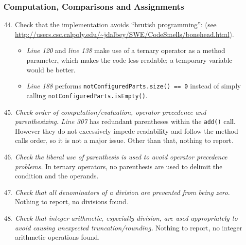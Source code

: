 	\subsubsection{Computation, Comparisons and Assignments}
		\begin{enumerate}
			\setcounter{enumi}{43}
			\item \begin{itshape}
				Check that the implementation avoids “brutish programming”: (see \url{http://users.csc.calpoly.edu/~jdalbey/SWE/CodeSmells/bonehead.html}).
				\end{itshape}
			\begin{itemize}
				\item \textit{Line 120} and \textit{line 138} make use of a ternary operator as a method parameter, which makes the code less readable; a temporary variable would be better.
				\item \textit{Line 188} performs \texttt{notConfiguredParts.size() == 0} instead of simply calling \texttt{notConfiguredParts.isEmpty()}.
			\end{itemize}

			\item \textit{Check order of computation/evaluation, operator precedence and parenthesizing.}\newline
			\textit{Line 307} has redundant parentheses within the \texttt{add()} call. However they do not excessively impede readability and follow the method calls order, so it is not a major issue. Other than that, nothing to report.

			\item \textit{Check the liberal use of parenthesis is used to avoid operator precedence problems.}\newline
			In ternary operators, no parenthesis are used to delimit the condition and the operands.

			\item \textit{Check that all denominators of a division are prevented from being zero.}\newline
			Nothing to report, no divisions found. %

			\item \textit{Check that integer arithmetic, especially division, are used appropriately to avoid causing unexpected truncation/rounding.}\newline
			Nothing to report, no integer arithmetic operations found. %


\end{enumerate}
